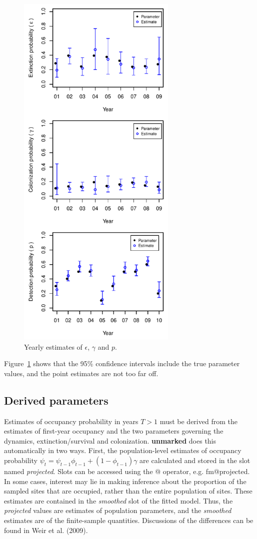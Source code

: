 \documentclass[12pt]{article}
\begin{document}
\begin{figure}
  \centering
  \includegraphics[width=3in,height=7in]{colext-yearlysim.pdf}
  \caption{Yearly estimates of $\epsilon$, $\gamma$ and $p$.}
  \label{fig:yearlysim}
\end{figure}

Figure~\ref{fig:yearlysim} shows that the 95\% confidence intervals
include the true parameter values, and the point estimates are not too
far off.


\subsection{Derived parameters}

Estimates of occupancy probability in years $T>1$ must be derived from the
estimates of first-year occupancy and the two parameters governing the
dynamics, extinction/survival and colonization.
\textbf{unmarked} does this automatically in two ways. First, the
population-level estimates of occupancy probability
$\psi_t = \psi_{t-1}\phi_{t-1} + (1-\phi_{t-1})\gamma$ are calculated
and stored in the slot named \emph{projected}. Slots can be accessed
using the @ operator, e.g. fm@projected.
In some cases, interest may lie in making
inference about the proportion of the sampled sites that are occupied,
rather than the entire population of sites. These estimates are
contained in the \emph{smoothed} slot of the fitted model. Thus, the
\emph{projected} values are estimates of population parameters, and
the \emph{smoothed} estimates are of the finite-sample
quantities. Discussions of the differences can be found in Weir et
al. (2009).
\end{document}

